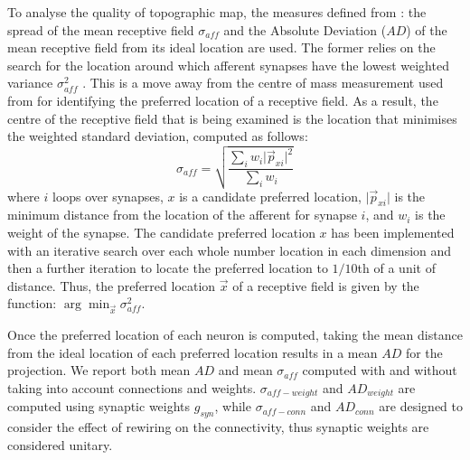 \documentclass[letterpaper, 10 pt, conference]{ieeeconf}  %
\begin{document}


To analyse the quality of topographic map, the measures defined from \cite{bamford2010synaptic}: the spread of the mean receptive field $\sigma_{aff}$ and the Absolute Deviation ($AD$) of the mean receptive field from its ideal location are used.   
The former relies on the search for the location around which afferent synapses have the lowest weighted variance $\sigma^2_{aff}$ . 
This is a move away from the centre of mass measurement used from \cite{Elliott1999} for identifying the preferred location of a receptive field. As a result, the centre of the receptive field that is being examined is the location that minimises the weighted standard deviation, computed as follows:
%
\begin{equation}
    \sigma_{aff} = \sqrt{\frac{\sum_i{w_i\lvert{\vec{p}_{xi}}\rvert^2}}{\sum_i{w_i}}}
\end{equation}
%
where $i$ loops over synapses, $x$ is a candidate preferred location, $\lvert{\vec{p}_{xi}}\rvert$ is the minimum distance from the location of the afferent for synapse $i$, and $w_i$ is the weight of the synapse.
The candidate preferred location $x$ has been implemented with an iterative search over each whole number location in each dimension and then a further iteration to locate the preferred location to $1/10$th of a unit of distance. Thus, the preferred location $\vec{x}$ of a receptive field is given by the function: $\arg\min_{\vec{x}}{\sigma^2_{aff}}$.

Once the preferred location of each neuron is computed, taking the mean distance from the ideal location of each preferred location results in a mean $AD$ for the projection. 
We report both mean $AD$ and mean $\sigma_{aff}$ computed with and without taking into account connections and  weights. 
$\sigma_{aff-weight}$ and $AD_{weight}$ are computed using synaptic weights $g_{syn}$, 
while $\sigma_{aff-conn}$ and $AD_{conn}$ are designed to consider the effect of rewiring on the connectivity, thus synaptic weights are considered unitary.

\end{document}
